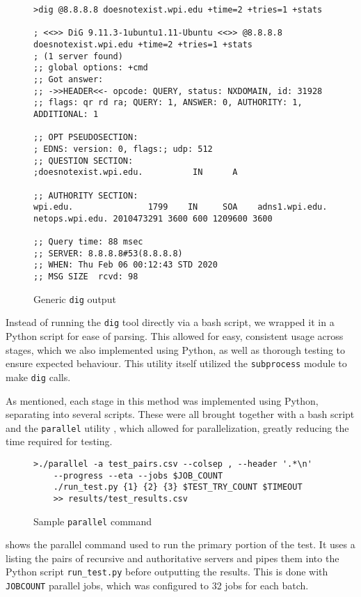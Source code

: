 \begin{figure}[H]
    \centering
    \begin{verbatim}
>dig @8.8.8.8 doesnotexist.wpi.edu +time=2 +tries=1 +stats

; <<>> DiG 9.11.3-1ubuntu1.11-Ubuntu <<>> @8.8.8.8 
doesnotexist.wpi.edu +time=2 +tries=1 +stats
; (1 server found)
;; global options: +cmd
;; Got answer:
;; ->>HEADER<<- opcode: QUERY, status: NXDOMAIN, id: 31928
;; flags: qr rd ra; QUERY: 1, ANSWER: 0, AUTHORITY: 1, 
ADDITIONAL: 1

;; OPT PSEUDOSECTION:
; EDNS: version: 0, flags:; udp: 512
;; QUESTION SECTION:
;doesnotexist.wpi.edu.          IN      A

;; AUTHORITY SECTION:
wpi.edu.               1799    IN     SOA    adns1.wpi.edu.
netops.wpi.edu. 2010473291 3600 600 1209600 3600

;; Query time: 88 msec
;; SERVER: 8.8.8.8#53(8.8.8.8)
;; WHEN: Thu Feb 06 00:12:43 STD 2020
;; MSG SIZE  rcvd: 98
    \end{verbatim}
    \caption{Generic \texttt{dig} output}
    \label{fig:generic_dig_output}
\end{figure}

Instead of running the \texttt{dig} tool directly via a bash script, we wrapped it in a Python script for ease of parsing. This allowed for easy, consistent usage across stages, which we also implemented using Python, as well as thorough testing to ensure expected behaviour. This utility itself utilized the \texttt{subprocess} module to make \texttt{dig} calls.

As mentioned, each stage in this method was implemented using Python, separating into several scripts. These were all brought together with a bash script and the \texttt{parallel} utility \cite{Tange2011}, which allowed for parallelization, greatly reducing the time required for testing.

\begin{figure}[h]
    \centering
    \begin{verbatim}
>./parallel -a test_pairs.csv --colsep , --header '.*\n' 
    --progress --eta --jobs $JOB_COUNT 
    ./run_test.py {1} {2} {3} $TEST_TRY_COUNT $TIMEOUT 
    >> results/test_results.csv
    \end{verbatim}
    \caption{Sample \texttt{parallel} command}
    \label{fig:dns_sample_parallel_command}
\end{figure}

 shows the parallel command used to run the primary portion of the test. It uses a \csv listing the pairs of recursive and authoritative \dns servers and pipes them into the Python script \texttt{run\_test.py} before outputting the results. This is done with \texttt{JOBCOUNT} parallel jobs, which was configured to 32 jobs for each batch.

